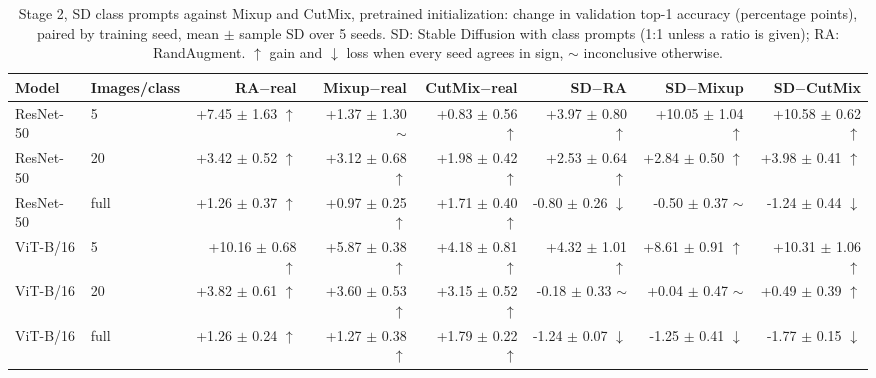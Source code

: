 \begin{table}[H]
\centering
\small
\setlength{\tabcolsep}{4pt}
\caption{Stage 2, SD class prompts against Mixup and CutMix, pretrained initialization: change in validation top-1 accuracy (percentage points), paired by training seed, mean $\pm$ sample SD over 5 seeds. SD: Stable Diffusion with class prompts (1:1 unless a ratio is given); RA: RandAugment. $\uparrow$ gain and $\downarrow$ loss when every seed agrees in sign, $\sim$ inconclusive otherwise.}
\label{tab:stage2-mixing-pretrained}
\begin{tabular}{llrrrrrr}
\toprule
Model & Images/class & RA$-$real & Mixup$-$real & CutMix$-$real & SD$-$RA & SD$-$Mixup & SD$-$CutMix \\
\midrule
ResNet-50 & 5 & +7.45 $\pm$ 1.63 $\uparrow$ & +1.37 $\pm$ 1.30 $\sim$ & +0.83 $\pm$ 0.56 $\uparrow$ & +3.97 $\pm$ 0.80 $\uparrow$ & +10.05 $\pm$ 1.04 $\uparrow$ & +10.58 $\pm$ 0.62 $\uparrow$ \\
ResNet-50 & 20 & +3.42 $\pm$ 0.52 $\uparrow$ & +3.12 $\pm$ 0.68 $\uparrow$ & +1.98 $\pm$ 0.42 $\uparrow$ & +2.53 $\pm$ 0.64 $\uparrow$ & +2.84 $\pm$ 0.50 $\uparrow$ & +3.98 $\pm$ 0.41 $\uparrow$ \\
ResNet-50 & full & +1.26 $\pm$ 0.37 $\uparrow$ & +0.97 $\pm$ 0.25 $\uparrow$ & +1.71 $\pm$ 0.40 $\uparrow$ & -0.80 $\pm$ 0.26 $\downarrow$ & -0.50 $\pm$ 0.37 $\sim$ & -1.24 $\pm$ 0.44 $\downarrow$ \\
\midrule
ViT-B/16 & 5 & +10.16 $\pm$ 0.68 $\uparrow$ & +5.87 $\pm$ 0.38 $\uparrow$ & +4.18 $\pm$ 0.81 $\uparrow$ & +4.32 $\pm$ 1.01 $\uparrow$ & +8.61 $\pm$ 0.91 $\uparrow$ & +10.31 $\pm$ 1.06 $\uparrow$ \\
ViT-B/16 & 20 & +3.82 $\pm$ 0.61 $\uparrow$ & +3.60 $\pm$ 0.53 $\uparrow$ & +3.15 $\pm$ 0.52 $\uparrow$ & -0.18 $\pm$ 0.33 $\sim$ & +0.04 $\pm$ 0.47 $\sim$ & +0.49 $\pm$ 0.39 $\uparrow$ \\
ViT-B/16 & full & +1.26 $\pm$ 0.24 $\uparrow$ & +1.27 $\pm$ 0.38 $\uparrow$ & +1.79 $\pm$ 0.22 $\uparrow$ & -1.24 $\pm$ 0.07 $\downarrow$ & -1.25 $\pm$ 0.41 $\downarrow$ & -1.77 $\pm$ 0.15 $\downarrow$ \\
\bottomrule
\end{tabular}
\end{table}
